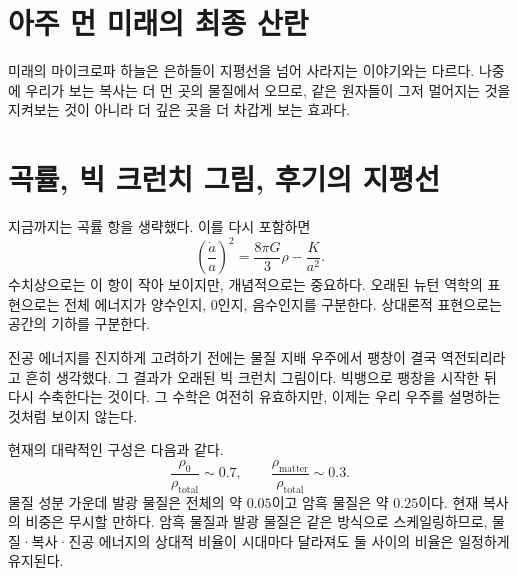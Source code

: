 \section{아주 먼 미래의 최종 산란}

미래의 마이크로파 하늘은 은하들이 지평선을 넘어 사라지는 이야기와는 다르다. 나중에 우리가 보는 복사는 더 먼 곳의 물질에서 오므로, 같은 원자들이 그저 멀어지는 것을 지켜보는 것이 아니라 더 깊은 곳을 더 차갑게 보는 효과다.

\begin{classroomqa}
\end{classroomqa}

\section{곡률, 빅 크런치 그림, 후기의 지평선}

지금까지는 곡률 항을 생략했다. 이를 다시 포함하면
\begin{equation}
\left(\frac{\dot a}{a}\right)^2
=
\frac{8\pi G}{3}\rho
-
\frac{K}{a^2}.
\end{equation}
수치상으로는 이 항이 작아 보이지만, 개념적으로는 중요하다. 오래된 뉴턴 역학의 표현으로는 전체 에너지가 양수인지, 0인지, 음수인지를 구분한다. 상대론적 표현으로는 공간의 기하를 구분한다.

진공 에너지를 진지하게 고려하기 전에는 물질 지배 우주에서 팽창이 결국 역전되리라고 흔히 생각했다. 그 결과가 오래된 빅 크런치 그림이다. 빅뱅으로 팽창을 시작한 뒤 다시 수축한다는 것이다. 그 수학은 여전히 유효하지만, 이제는 우리 우주를 설명하는 것처럼 보이지 않는다.

\begin{classroomqa}
\end{classroomqa}

현재의 대략적인 구성은 다음과 같다.
\begin{equation}
\frac{\rho_0}{\rho_{\text{total}}}\sim 0.7,
\qquad
\frac{\rho_{\text{matter}}}{\rho_{\text{total}}}\sim 0.3.
\end{equation}
물질 성분 가운데 발광 물질은 전체의 약 \(0.05\)이고 암흑 물질은 약 \(0.25\)이다. 현재 복사의 비중은 무시할 만하다. 암흑 물질과 발광 물질은 같은 방식으로 스케일링하므로, 물질·복사·진공 에너지의 상대적 비율이 시대마다 달라져도 둘 사이의 비율은 일정하게 유지된다.

